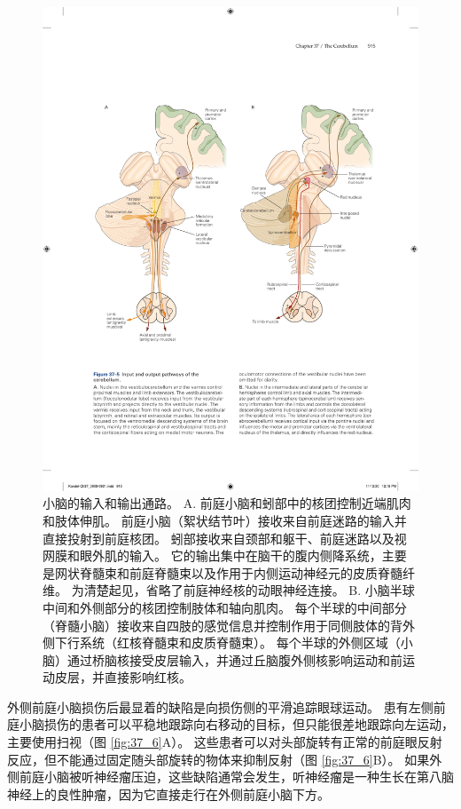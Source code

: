 \begin{figure}[htbp]
	\centering
	\includegraphics[width=0.9\linewidth]{chap37/fig_37_5}
	\caption{小脑的输入和输出通路。 A. 前庭小脑和蚓部中的核团控制近端肌肉和肢体伸肌。 前庭小脑（絮状结节叶）接收来自前庭迷路的输入并直接投射到前庭核团。 蚓部接收来自颈部和躯干、前庭迷路以及视网膜和眼外肌的输入。 它的输出集中在脑干的腹内侧降系统，主要是网状脊髓束和前庭脊髓束以及作用于内侧运动神经元的皮质脊髓纤维。 为清楚起见，省略了前庭神经核的动眼神经连接。 B. 小脑半球中间和外侧部分的核团控制肢体和轴向肌肉。 每个半球的中间部分（脊髓小脑）接收来自四肢的感觉信息并控制作用于同侧肢体的背外侧下行系统（红核脊髓束和皮质脊髓束）。 每个半球的外侧区域（小脑）通过桥脑核接受皮层输入，并通过丘脑腹外侧核影响运动和前运动皮层，并直接影响红核。}
	\label{fig:37_5}
\end{figure}


外侧前庭小脑损伤后最显着的缺陷是向损伤侧的平滑追踪眼球运动。
患有左侧前庭小脑损伤的患者可以平稳地跟踪向右移动的目标，但只能很差地跟踪向左运动，主要使用扫视（图 \ref{fig:37_6}A）。
这些患者可以对头部旋转有正常的前庭眼反射反应，但不能通过固定随头部旋转的物体来抑制反射（图 \ref{fig:37_6}B）。
如果外侧前庭小脑被听神经瘤压迫，这些缺陷通常会发生，听神经瘤是一种生长在第八脑神经上的良性肿瘤，因为它直接走行在外侧前庭小脑下方。


